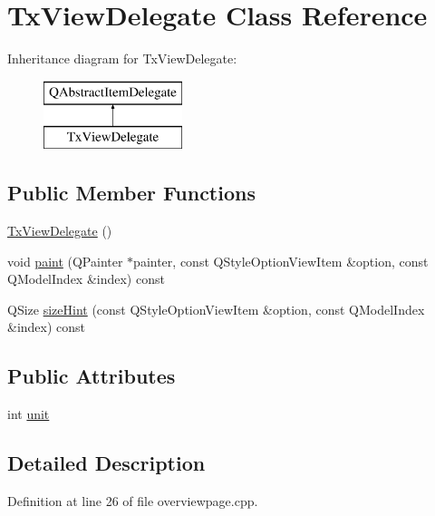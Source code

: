 \hypertarget{class_tx_view_delegate}{}\section{Tx\+View\+Delegate Class Reference}
\label{class_tx_view_delegate}
Inheritance diagram for Tx\+View\+Delegate\+:\begin{figure}[H]
\begin{center}
\leavevmode
\includegraphics[height=2.000000cm]{class_tx_view_delegate}
\end{center}
\end{figure}
\subsection*{Public Member Functions}
\begin{DoxyCompactItemize}
\item 
\hyperlink{class_tx_view_delegate_a275fb9b088109b84c9d9d8f8cae0c67d}{Tx\+View\+Delegate} ()
\item 
void \hyperlink{class_tx_view_delegate_affeec94c01339a5eeb31b648c41baf02}{paint} (Q\+Painter $\ast$painter, const Q\+Style\+Option\+View\+Item \&option, const Q\+Model\+Index \&index) const 
\item 
Q\+Size \hyperlink{class_tx_view_delegate_ab5fd43199d65a643bc1b631a8025a421}{size\+Hint} (const Q\+Style\+Option\+View\+Item \&option, const Q\+Model\+Index \&index) const 
\end{DoxyCompactItemize}
\subsection*{Public Attributes}
\begin{DoxyCompactItemize}
\item 
int \hyperlink{class_tx_view_delegate_a4281e394dd7e90ecd8401fdca7b0413a}{unit}
\end{DoxyCompactItemize}


\subsection{Detailed Description}


Definition at line 26 of file overviewpage.\+cpp.



